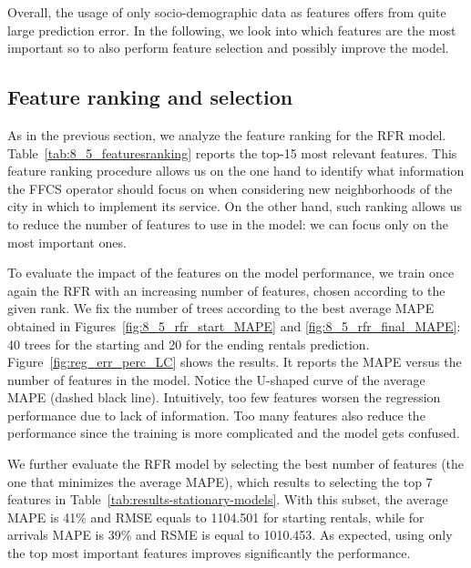 Overall, the usage of only socio-demographic data as features offers from quite large prediction error. In the following, we look into which features are the most important so to also perform feature selection and possibly improve the model.

\subsection{Feature ranking and selection}

As in the previous section, we analyze the feature ranking for the RFR model. 
Table~\ref{tab:8_5_featuresranking} reports the top-15 most relevant features. 
This feature ranking procedure allows us on the one hand to identify what information the FFCS operator should focus on when considering new neighborhoods of the city in which to implement its service. 
On the other hand, such ranking allows us to reduce the number of features to use in the model: we can focus only on the most important ones.

To evaluate the impact of the features on the model performance, we train once again the RFR with an increasing number of features, chosen according to the given rank. We fix the number of trees according to the best average MAPE obtained in Figures~\ref{fig:8_5_rfr_start_MAPE} and \ref{fig:8_5_rfr_final_MAPE}: 40 trees for the starting and 20 for the ending rentals prediction. Figure~\ref{fig:reg_err_perc_LC} shows the results. It reports the MAPE versus the number of features in the model.
Notice the U-shaped curve of the average MAPE (dashed black line). Intuitively, too few features worsen the regression performance due to lack of information. Too many features also reduce the performance since the training is more complicated and the model gets confused.

We further evaluate the RFR model by selecting the best number of features (the one that minimizes the average MAPE), which results to selecting the top 7 features in Table~\ref{tab:results-stationary-models}. With this subset, the average MAPE is 41\% and RMSE equals to 1104.501 for starting rentals, while for arrivals
MAPE is 39\% and  RSME is equal to 1010.453.%
As expected, using only the top most important features improves significantly the performance.

